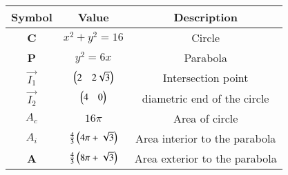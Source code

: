 \begin{tabular}[12pt]{ |c|c|c|}
    \hline
    \textbf{Symbol} & \textbf{Value} & \textbf{Description} \\
    \hline
    \textbf{C} & $x^{2}+y^{2}=16$ & Circle\\
    \hline
    \textbf{P} & $y^{2}=6x$ & Parabola\\
    \hline
    \textbf{$\vec{I_1}$} & $\begin{pmatrix}2&2\sqrt{3}\end{pmatrix}$ & Intersection point\\
    \hline
    \textbf{$\vec{I_2}$} & $\begin{pmatrix}4&0\end{pmatrix}$ & diametric end of the circle\\
    \hline
    \textbf{$A_c$} & $16\pi$ & Area of circle\\
    \hline
    \textbf{$A_i$} & $\frac{4}{3}\left(4\pi + \sqrt{3}\right)$ & Area interior to the parabola\\
    \hline
    \textbf{A} & $\frac{4}{3}\left(8\pi + \sqrt{3}\right)$ & Area exterior to the parabola\\
	\hline
    \end{tabular}
